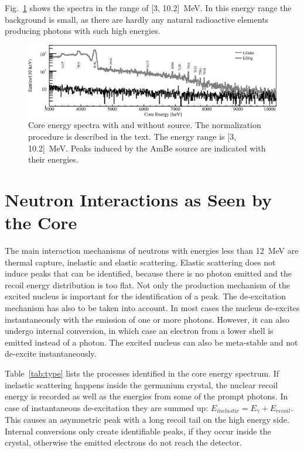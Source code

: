 \documentclass{elsart}
\begin{document}
Fig.~\ref{fig:specl} shows the spectra in the range of [3,
10.2]~MeV. In this energy range the background is small, as there are
hardly any natural radioactive elements producing photons with such
high energies.

\begin{figure}[tbhp]
  \centering
  \includegraphics[width=\textwidth,clip]{spectra_3_11MeV.eps}
  \caption{Core energy spectra with and without source. The
    normalization procedure is described in the text. The energy range
    is [3, 10.2]~MeV. Peaks induced by the AmBe source are indicated
    with their energies.}
  \label{fig:specl}
\end{figure}

\section{Neutron Interactions as Seen by the Core}
\label{sec:type}
The main interaction mechanisms of neutrons with energies less than
12~MeV are thermal capture, inelastic and elastic scattering. Elastic
scattering does not induce peaks that can be identified, because there
is no photon emitted and the recoil energy distribution is too flat.
Not only the production mechanism of the excited nucleus is important
for the identification of a peak. The de-excitation mechanism has also
to be taken into account. In most cases the nucleus de-excites
instantaneously with the emission of one or more photons. However, it
can also undergo internal conversion, in which case an electron from a
lower shell is emitted instead of a photon. The excited nucleus can
also be meta-stable and not de-excite instantaneously.

Table~\ref{tab:type} lists the processes identified in the core energy
spectrum. If inelastic scattering happens inside the germanium
crystal, the nuclear recoil energy is recorded as well as the energies
from some of the prompt photons. In case of instantaneous
de-excitation they are summed up: $E_{inelastic} = E_{\gamma} +
E_{recoil}$. This causes an asymmetric peak with a long recoil tail on
the high energy side. Internal conversions only create identifiable
peaks, if they occur inside the crystal, otherwise the emitted
electrons do not reach the detector.
\end{document}
